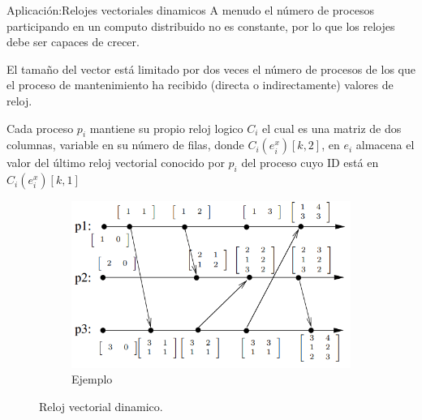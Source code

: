 \begin{frame}[fragile]{Aplicación:}{Relojes vectoriales dinamicos}
    \justifying
    A menudo el número de procesos participando en un computo distribuido no es constante, por lo que los relojes debe ser capaces de crecer.
    

    El tamaño del vector está limitado por dos veces el número de procesos de los que el proceso de mantenimiento ha recibido (directa o indirectamente) valores de reloj.
    
    Cada proceso $p_i$ mantiene su propio reloj logico $C_i$ el cual es una matriz de dos columnas, variable en su número de filas, donde $C_i(e_i^x)[k,2]$, en $e_i$ almacena el valor del último reloj vectorial conocido por $p_i$ del proceso cuyo ID está en $C_i(e_i^x)[k,1]$ 

    \begin{figure}
        \centering
        \begin{subfigure}[b]{0.5\textwidth}
            \includegraphics[width=\textwidth]{./rvd01.png}
            \caption{Ejemplo}
            \label{fig:Relojes vectoriales dinamicos}
        \end{subfigure}
        \caption{Reloj vectorial dinamico.}\label{fig:Deteccion.}
    \end{figure}    
\end{frame}